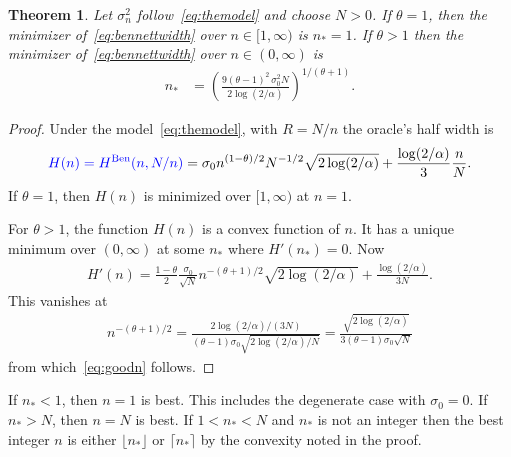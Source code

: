 \documentclass{article}
\newtheorem{theorem}{Theorem}
\newcommand{\art}[1]{\begingroup\color{blue}#1\endgroup}
\renewcommand{\le}{\leqslant}
\newcommand{\ben}{\mathrm{Ben}}
\begin{document}
\begin{theorem}\label{thm:goodn}
Let $\sigma^2_n$ follow~\eqref{eq:themodel} and choose $N>0$.
If $\theta=1$, then the minimizer of~\eqref{eq:bennettwidth} 
over $n\in[1,\infty)$ is $n_*=1$.
If $\theta>1$ then the minimizer of~\eqref{eq:bennettwidth}
over $n\in(0,\infty)$ is 
\begin{align}\label{eq:goodn}
n_*& 
 = 
\left(\frac{9(\theta-1)^2\,\sigma_0^2
N}{2\log(2/\alpha)}\right)^{1/(\theta+1)}.
\end{align}\end{theorem}




\begin{proof}
Under the model~\eqref{eq:themodel}, with $R=N/n$
the oracle's half width is
\begin{align}\label{eq:benh}
\art{H(n) = H^\ben(n,N/n)}=\sigma_0n^{(1-\theta)/2}N^{-1/2}
\sqrt{2\log(2/\alpha)}
+\frac{\log(2/\alpha)}{3}\frac{n}N.
\end{align}
If $\theta=1$, then $H(n)$ is minimized over $[1,\infty)$ at $n=1$.

For $\theta>1$, the function $H(n)$ is a convex function of $n$.
It has a unique minimum over $(0,\infty)$ at
some $n_*$ where $H'(n_*)=0$. Now
\begin{align*}
H'(n)=\frac{1-\theta}2\frac{\sigma_0}{\sqrt{N}}n^{-(\theta+1)/2}
\sqrt{2\log(2/\alpha)}  + \frac{\log(2/\alpha)}{3N}.
\end{align*}
This vanishes at 
\begin{align*}
n^{-(\theta+1)/2} = 
\frac{2\log(2/\alpha)/(3N)}
{(\theta-1)\sigma_0
\sqrt{2\log(2/\alpha)/N}}=
\frac{\sqrt{2\log(2/\alpha)}}
{3(\theta-1)\sigma_0
\sqrt{N}}
\end{align*}
from which~\eqref{eq:goodn} follows.
\end{proof}

\art{If $n_*<1$, then $n=1$ is best.
This includes the degenerate case with $\sigma_0=0$.
If $n_*>N$, then $n=N$ is best.
If $1<n_*<N$ and $n_*$ is not an integer then the
best integer $n$ is either $\lfloor n_*\rfloor$
or $\lceil n_*\rceil$ by the convexity noted in the proof.}
\end{document}
